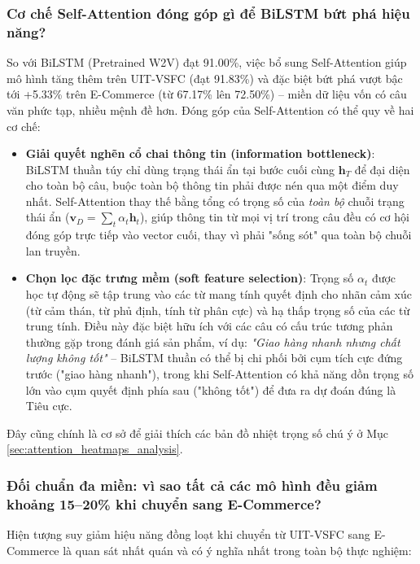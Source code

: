 \documentclass[12pt,a4paper]{article}
\begin{document}
\subsubsection{Cơ chế Self-Attention đóng góp gì để BiLSTM bứt phá hiệu năng?}\label{sec:discuss_attention_gain}
So với BiLSTM (Pretrained W2V) đạt 91.00\%, việc bổ sung Self-Attention giúp mô hình tăng thêm trên UIT-VSFC (đạt 91.83\%) và đặc biệt bứt phá vượt bậc tới +5.33\% trên E-Commerce (từ 67.17\% lên 72.50\%) -- miền dữ liệu vốn có câu văn phức tạp, nhiều mệnh đề hơn. Đóng góp của Self-Attention có thể quy về hai cơ chế:
\begin{itemize}[leftmargin=1.0cm, itemsep=2pt]
    \item[--] \textbf{Giải quyết nghẽn cổ chai thông tin (information bottleneck)}: BiLSTM thuần túy chỉ dùng trạng thái ẩn tại bước cuối cùng $\mathbf{h}_T$ để đại diện cho toàn bộ câu, buộc toàn bộ thông tin phải được nén qua một điểm duy nhất. Self-Attention thay thế bằng tổng có trọng số của \textit{toàn bộ} chuỗi trạng thái ẩn ($\mathbf{v}_D = \sum_t \alpha_t \mathbf{h}_t$), giúp thông tin từ mọi vị trí trong câu đều có cơ hội đóng góp trực tiếp vào vector cuối, thay vì phải "sống sót" qua toàn bộ chuỗi lan truyền.
    \item[--] \textbf{Chọn lọc đặc trưng mềm (soft feature selection)}: Trọng số $\alpha_t$ được học tự động sẽ tập trung vào các từ mang tính quyết định cho nhãn cảm xúc (từ cảm thán, từ phủ định, tính từ phân cực) và hạ thấp trọng số của các từ trung tính. Điều này đặc biệt hữu ích với các câu có cấu trúc tương phản thường gặp trong đánh giá sản phẩm, ví dụ: \textit{"Giao hàng nhanh nhưng chất lượng không tốt"} -- BiLSTM thuần có thể bị chi phối bởi cụm tích cực đứng trước ("giao hàng nhanh"), trong khi Self-Attention có khả năng dồn trọng số lớn vào cụm quyết định phía sau ("không tốt") để đưa ra dự đoán đúng là Tiêu cực.
\end{itemize}
Đây cũng chính là cơ sở để giải thích các bản đồ nhiệt trọng số chú ý ở Mục \ref{sec:attention_heatmaps_analysis}.

\subsubsection{Đối chuẩn đa miền: vì sao tất cả các mô hình đều giảm khoảng 15--20\% khi chuyển sang E-Commerce?}\label{sec:discuss_domain_gap}
Hiện tượng suy giảm hiệu năng đồng loạt khi chuyển từ UIT-VSFC sang E-Commerce là quan sát nhất quán và có ý nghĩa nhất trong toàn bộ thực nghiệm:
\end{document}
